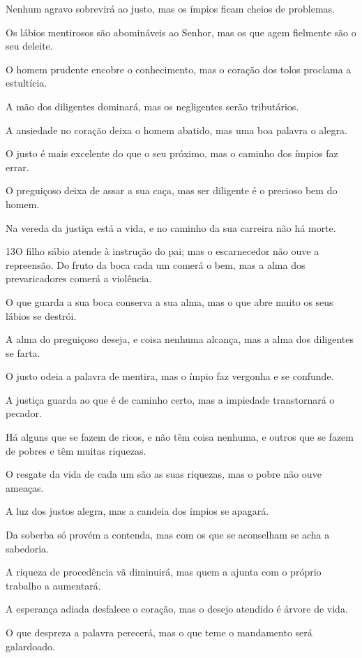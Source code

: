Nenhum agravo sobrevirá ao justo, mas os ímpios ficam cheios de
problemas.

Os lábios mentirosos são abomináveis ao Senhor, mas os que agem
fielmente são o seu deleite.

O homem prudente encobre o conhecimento, mas o coração dos tolos
proclama a estultícia.

A mão dos diligentes dominará, mas os negligentes serão
tributários.

A ansiedade no coração deixa o homem abatido, mas uma boa palavra
o alegra.

O justo é mais excelente do que o seu próximo, mas o caminho dos
ímpios faz errar.

O preguiçoso deixa de assar a sua caça, mas ser diligente é o
precioso bem do homem.

Na vereda da justiça está a vida, e no caminho da sua carreira
não há morte.

\medskip

\lettrine{13}{}O filho sábio atende à instrução do pai; mas o
escarnecedor não ouve a repreensão.  Do fruto da
boca cada um comerá o bem, mas a alma dos prevaricadores comerá a
violência.

O que guarda a sua boca conserva a sua alma, mas o que abre muito
os seus lábios se destrói.

A alma do preguiçoso deseja, e coisa nenhuma alcança, mas a alma
dos diligentes se farta.

O justo odeia a palavra de mentira, mas o ímpio faz vergonha e se
confunde.

A justiça guarda ao que é de caminho certo, mas a impiedade
transtornará o pecador.

Há alguns que se fazem de ricos, e não têm coisa nenhuma, e outros
que se fazem de pobres e têm muitas riquezas.

O resgate da vida de cada um são as suas riquezas, mas o pobre não
ouve ameaças.

A luz dos justos alegra, mas a candeia dos ímpios se apagará.

Da soberba só provém a contenda, mas com os que se aconselham se
acha a sabedoria.

A riqueza de procedência vã diminuirá, mas quem a ajunta com o
próprio trabalho a aumentará.

A esperança adiada desfalece o coração, mas o desejo atendido é
árvore de vida.

O que despreza a palavra perecerá, mas o que teme o mandamento
será galardoado.

